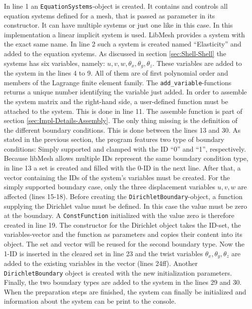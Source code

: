    In line 1 an \texttt{EquationSystems}-object is created. It contains and controls all equation systems defined for a mesh, that is passed as parameter in its constructor. It can have multiple systems or just one like in this case. In this implementation a linear implicit system is used. LibMesh provides a system with the exact same name. In line 2 such a system is created named ``Elasticity'' and added to the equation systems. As discussed in section \ref{sec:Shell-Shell} the systems has six variables, namely: $u, v, w, \theta_x, \theta_y, \theta_z$. These variables are added to the system in the lines 4 to 9. All of them are of first polynomial order and members of the Lagrange finite element family. The \texttt{add\_variable}-functions returns a unique number identifying the variable just added. In order to assemble the system matrix and the right-hand side, a user-defined function must be attached to the system. This is done in line 11. The assemble function is part of section \ref{sec:Impl-Details-Assembly}. The only thing missing is the definition of the different boundary conditions. This is done between the lines 13 and 30. As stated in the previous section, the program features two type of boundary conditions: Simply supported and clamped with the ID ``0'' and ``1'', respectively. Because libMesh allows multiple IDs represent the same boundary condition type, in line 13 a set is created and filled with the 0-ID in the next line. After that, a vector containing the IDs of the system's variables must be created. For the simply supported boundary case, only the three displacement variables $u,v,w$ are affected (lines 15-18). Before creating the \texttt{DirichletBoundary}-object, a function supplying the Dirichlet value must be defined. In this case the value must be zero at the boundary. A \texttt{ConstFunction} initialized with the value zero is therefore created in line 19. The constructor for the Dirichlet object takes the ID-set, the variables-vector and the function as parameters and copies their content into its object. The set and vector will be reused for the second boundary type. Now the 1-ID is inserted in the cleared set in line 23 and the twist variables $\theta_x, \theta_y, \theta_z$ are added to the existing variables in the vector (lines 24ff). Another \texttt{DirichletBoundary} object is created with the new initialization parameters. Finally, the two boundary types are added to the system in the lines 29 and 30. When the preparation steps are finished, the system can finally be initialized and information about the system can be print to the console.
     

